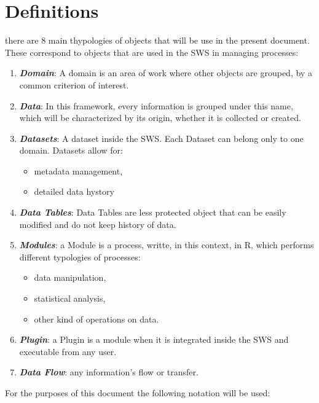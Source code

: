 \documentclass[]{article}
\providecommand{\tightlist}{%
  \setlength{\itemsep}{0pt}\setlength{\parskip}{0pt}}
\begin{document}
\section*{Definitions}\label{definitions}

there are 8 main thypologies of objects that will be use in the present
document. These correspond to objects that are used in the SWS in
managing processes:

\begin{enumerate}
\def\labelenumi{\arabic{enumi}.}
\tightlist
\item
  \textbf{\emph{Domain}}: A domain is an area of work where other
  objects are grouped, by a common criterion of interest.
\item
  \textbf{\emph{Data}}: In this framework, every information is grouped
  under this name, which will be characterized by its origin, whether it
  is collected or created.
\item
  \textbf{\emph{Datasets}}: A dataset inside the SWS. Each Dataset can
  belong only to one domain. Datasets allow for:

  \begin{itemize}
  \tightlist
  \item
    metadata management,
  \item
    detailed data hystory
  \end{itemize}
\item
  \textbf{\emph{Data Tables}}: Data Tables are less protected object
  that can be easily modified and do not keep history of data.
\item
  \textbf{\emph{Modules}}: a Module is a process, writte, in this
  context, in R, which performs different typologies of processes:

  \begin{itemize}
  \tightlist
  \item
    data manipulation,
  \item
    statistical analysis,
  \item
    other kind of operations on data.
  \end{itemize}
\item
  \textbf{\emph{Plugin}}: a Plugin is a module when it is integrated
  inside the SWS and executable from any user.
\item
  \textbf{\emph{Data Flow}}: any information's flow or transfer.
\end{enumerate}

For the purposes of this document the following notation will be used:
\end{document}

